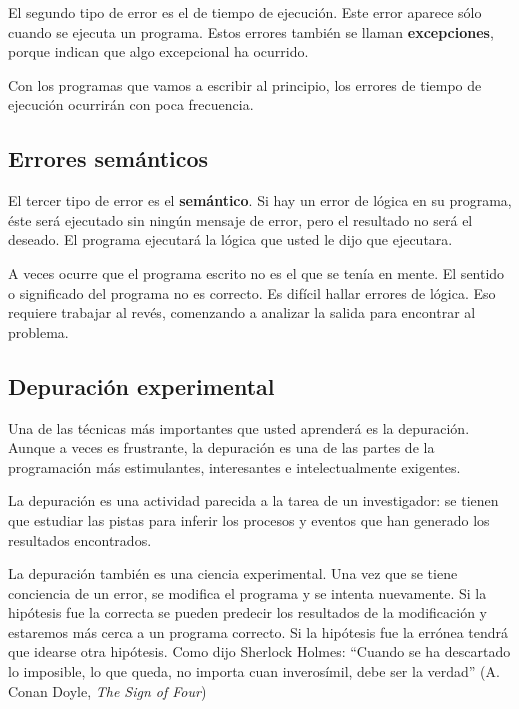 El segundo tipo de error es el de tiempo de ejecución. Este
error aparece sólo cuando se ejecuta un programa. Estos errores
también se llaman {\bf excepciones}, porque indican que algo
excepcional ha ocurrido.

Con los programas que vamos a escribir al principio, los errores de
tiempo de ejecución ocurrirán con poca frecuencia.

\subsection{Errores semánticos}

El tercer tipo de error es el {\bf semántico}.
Si hay un error de lógica en su programa, éste será
ejecutado sin ningún mensaje de error, pero el resultado no
será el deseado. El programa ejecutará la lógica que usted
le dijo que ejecutara.

A veces ocurre que el programa escrito no es el que se
tenía en mente. El sentido o significado del programa no es
correcto. Es difícil hallar errores de lógica. Eso requiere
trabajar al revés, comenzando a analizar la salida para
encontrar al problema.

\subsection{Depuración experimental}

Una de las técnicas más importantes que usted aprenderá es la
depuración. Aunque a veces es frustrante, la depuración es una
de las partes de la programación más estimulantes, interesantes e 
intelectualmente exigentes.


La depuración es una actividad parecida a la tarea de un
investigador: se tienen que estudiar las pistas para inferir los
procesos y eventos que han generado los resultados encontrados.

La depuración también es una ciencia experimental. Una vez
que se tiene conciencia de un error, se modifica el programa y se intenta
nuevamente. Si la hipótesis fue la correcta se pueden predecir los
resultados de la modificación y estaremos más cerca a un programa
correcto. Si la hipótesis fue la errónea tendrá que idearse otra
hipótesis. Como dijo Sherlock Holmes: ``Cuando se ha descartado lo
imposible, lo que queda, no importa cuan inverosímil, debe ser la
verdad'' (A. Conan Doyle, {\em The Sign of Four})


